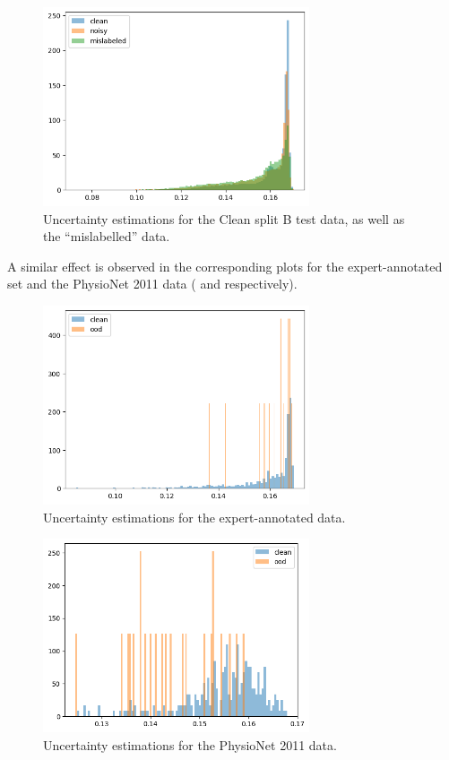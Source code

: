 \documentclass[a4paper,10pt]{article}
\begin{document}
\begin{figure}[htbp]
	\centering
	\includegraphics[width=0.7\textwidth]{uncertainty_umcu.png}
	\caption{Uncertainty estimations for the Clean split B test data, as well as the ``mislabelled'' data.}
	\label{fig:uncertainty_umcu}
\end{figure}

A similar effect is observed in the corresponding plots for the expert-annotated set and the PhysioNet 2011 data ( and  respectively).

\begin{figure}[htbp]
	\centering
	\includegraphics[width=0.7\textwidth]{uncertainty_segm.png}
	\caption{Uncertainty estimations for the expert-annotated data.}
	\label{fig:uncertainty_segm}
\end{figure}

\begin{figure}[htbp]
	\centering
	\includegraphics[width=0.7\textwidth]{uncertainty_phynet.png}
	\caption{Uncertainty estimations for the PhysioNet 2011 data.}
	\label{fig:uncertainty_phynet}
\end{figure}
\end{document}
